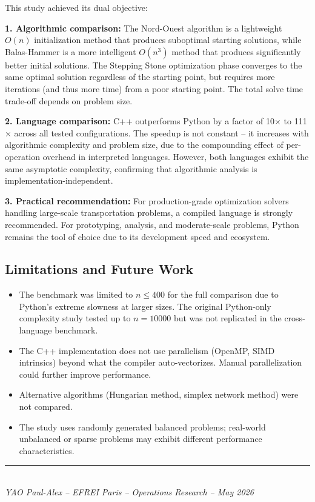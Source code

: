 \documentclass[12pt,a4paper]{article}
\begin{document}
This study achieved its dual objective:

\textbf{1. Algorithmic comparison:} The Nord-Ouest algorithm is a lightweight $O(n)$ initialization method that produces suboptimal starting solutions, while Balas-Hammer is a more intelligent $O(n^3)$ method that produces significantly better initial solutions. The Stepping Stone optimization phase converges to the same optimal solution regardless of the starting point, but requires more iterations (and thus more time) from a poor starting point. The total solve time trade-off depends on problem size.

\textbf{2. Language comparison:} C++ outperforms Python by a factor of 10$\times$ to 111$\times$ across all tested configurations. The speedup is not constant -- it increases with algorithmic complexity and problem size, due to the compounding effect of per-operation overhead in interpreted languages. However, both languages exhibit the same asymptotic complexity, confirming that algorithmic analysis is implementation-independent.

\textbf{3. Practical recommendation:} For production-grade optimization solvers handling large-scale transportation problems, a compiled language is strongly recommended. For prototyping, analysis, and moderate-scale problems, Python remains the tool of choice due to its development speed and ecosystem.

\subsection{Limitations and Future Work}

\begin{itemize}
  \item The benchmark was limited to $n \leq 400$ for the full comparison due to Python's extreme slowness at larger sizes. The original Python-only complexity study tested up to $n = 10000$ but was not replicated in the cross-language benchmark.
  \item The C++ implementation does not use parallelism (OpenMP, SIMD intrinsics) beyond what the compiler auto-vectorizes. Manual parallelization could further improve performance.
  \item Alternative algorithms (Hungarian method, simplex network method) were not compared.
  \item The study uses randomly generated balanced problems; real-world unbalanced or sparse problems may exhibit different performance characteristics.
\end{itemize}

\vfill

\begin{center}
\rule{0.5\textwidth}{0.4pt}\\[0.5cm]
\textit{YAO Paul-Alex -- EFREI Paris -- Operations Research -- May 2026}
\end{center}
\end{document}
